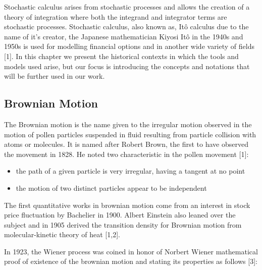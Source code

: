 \documentclass[12pt,twoside]{reedthesis}
\theoremstyle{definition}
\theoremstyle{definition}
\theoremstyle{remark}
\begin{document}
  Stochastic calculus arises from stochastic processes and allows the
  creation of a theory of integration where both the integrand and
  integrator terms are stochastic processes. Stochastic calculus, also
  known as, Itô calculus due to the name of it's creator, the Japanese
  mathematician Kiyosi Itô in the 1940s and 1950s is used for modelling
  financial options and in another wide variety of fields {[}1{]}. In this
  chapter we present the historical contexts in which the tools and models
  used arise, but our focus is introducing the concepts and notations that
  will be further used in our work.
  
  \subsection{Brownian Motion}\label{brownian-motion}
  
  The Brownian motion is the name given to the irregular motion observed
  in the motion of pollen particles suspended in fluid resulting from
  particle collision with atoms or molecules. It is named after Robert
  Brown, the first to have observed the movement in 1828. He noted two
  characteristic in the pollen movement {[}1{]}:
  
  \begin{itemize}
  \item
    the path of a given particle is very irregular, having a tangent at no
    point
  \item
    the motion of two distinct particles appear to be independent
  \end{itemize}
  
  The first quantitative works in brownian motion come from an interest in
  stock price fluctuation by Bachelier in 1900. Albert Einstein also
  leaned over the subject and in 1905 derived the transition density for
  Brownian motion from molecular-kinetic theory of heat {[}1,2{]}.
  
  In 1923, the Wiener process was coined in honor of Norbert Wiener
  mathematical proof of existence of the brownian motion and stating its
  properties as follows {[}3{]}:
  
\end{document}
